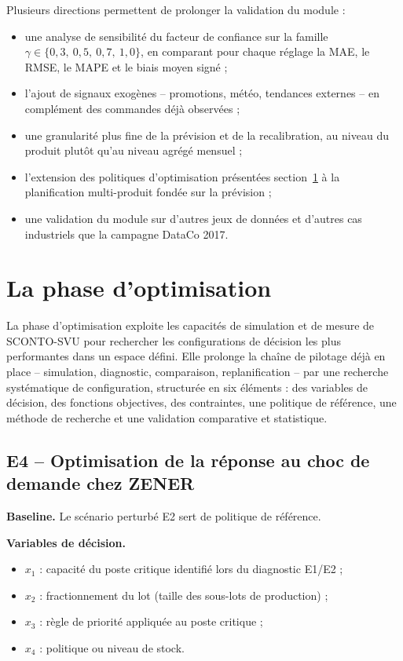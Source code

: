 \documentclass[11pt,a4paper]{article}
\begin{document}
Plusieurs directions permettent de prolonger la validation du module :
\begin{itemize}[leftmargin=1.5em]
  \item une analyse de sensibilité du facteur de confiance sur la famille \(\gamma \in \{0{,}3,\ 0{,}5,\ 0{,}7,\ 1{,}0\}\), en comparant pour chaque réglage la MAE, le RMSE, le MAPE et le biais moyen signé ;
  \item l'ajout de signaux exogènes -- promotions, météo, tendances externes -- en complément des commandes déjà observées ;
  \item une granularité plus fine de la prévision et de la recalibration, au niveau du produit plutôt qu'au niveau agrégé mensuel ;
  \item l'extension des politiques d'optimisation présentées section~\ref{sec:optimisation} à la planification multi-produit fondée sur la prévision ;
  \item une validation du module sur d'autres jeux de données et d'autres cas industriels que la campagne DataCo 2017.
\end{itemize}

\section{La phase d'optimisation}
\label{sec:optimisation}

La phase d'optimisation exploite les capacités de simulation et de mesure de SCONTO-SVU pour rechercher les configurations de décision les plus performantes dans un espace défini. Elle prolonge la chaîne de pilotage déjà en place -- simulation, diagnostic, comparaison, replanification -- par une recherche systématique de configuration, structurée en six éléments : des variables de décision, des fonctions objectives, des contraintes, une politique de référence, une méthode de recherche et une validation comparative et statistique.

\subsection{E4 -- Optimisation de la réponse au choc de demande chez ZENER}

\textbf{Baseline.} Le scénario perturbé E2 sert de politique de référence.

\textbf{Variables de décision.}
\begin{itemize}[leftmargin=1.5em]
  \item \(x_1\) : capacité du poste critique identifié lors du diagnostic E1/E2 ;
  \item \(x_2\) : fractionnement du lot (taille des sous-lots de production) ;
  \item \(x_3\) : règle de priorité appliquée au poste critique ;
  \item \(x_4\) : politique ou niveau de stock.
\end{itemize}
\end{document}
